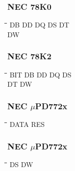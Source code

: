 \subsubsection{NEC 78K0}
{\tt\begin{tabbing}
\hspace{3cm}\=\hspace{3cm}\=\hspace{3cm}\=\hspace{3cm}\=\kill
DB         \> DD          \> DQ          \> DS          \> DT \\
DW \\
\end{tabbing}}

\subsubsection{NEC 78K2}
{\tt\begin{tabbing}
\hspace{3cm}\=\hspace{3cm}\=\hspace{3cm}\=\hspace{3cm}\=\kill
BIT        \> DB         \> DD          \> DQ          \> DS  \\
DT         \> DW \\
\end{tabbing}}

\subsubsection{NEC $\mu$PD772x}
{\tt\begin{tabbing}
\hspace{3cm}\=\hspace{3cm}\=\hspace{3cm}\=\hspace{3cm}\=\kill
DATA       \> RES \\
\end{tabbing}}

\subsubsection{NEC $\mu$PD772x}
{\tt\begin{tabbing} 
\hspace{3cm}\=\hspace{3cm}\=\hspace{3cm}\=\hspace{3cm}\=\kill
DS         \> DW \\
\end{tabbing}}

